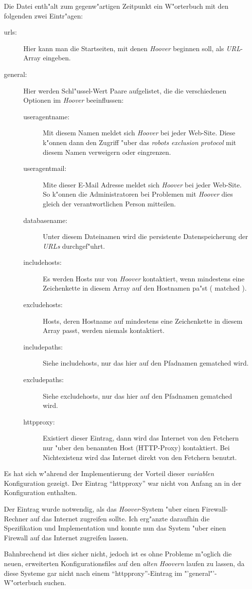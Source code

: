 Die Datei enth"alt zum gegenw"artigen Zeitpunkt ein W"orterbuch mit den folgenden zwei Eintr"agen:
\begin{description}
	\item[urls:]	Hier kann man die Startseiten, mit denen {\em Hoover} beginnen soll, als {\em URL}-Array eingeben.
	\item[general:]	Hier werden Schl"ussel-Wert Paare aufgelistet, die die verschiedenen Optionen im {\em Hoover} beeinflussen:
	\begin{description}
		\item[useragentname:]	Mit diesem Namen meldet sich {\em Hoover} bei jeder Web-Site. Diese k"onnen dann den Zugriff "uber das {\em robots exclusion protocol} mit diesem Namen verweigern oder eingrenzen.
		\item[useragentmail:]	Mite dieser E-Mail Adresse meldet sich {\em Hoover} bei jeder Web-Site. So k"onnen die Administratoren bei Problemen mit {\em Hoover} dies gleich der verantwortlichen Person mitteilen.
		\item[databasename:]	Unter diesem Dateinamen wird die persistente Datenspeicherung der {\em URLs} durchgef"uhrt.
		\item[includehosts:]	Es werden Hosts nur von {\em Hoover} kontaktiert, wenn mindestens eine Zeichenkette in diesem Array auf den Hostnamen pa"st ( matched ).
		\item[excludehosts:]	Hosts, deren Hostname auf mindestens eine Zeichenkette in diesem Array passt, werden niemals kontaktiert.
		\item[includepaths:]	Siehe includehosts, nur das hier auf den Pfadnamen gematched wird.
		\item[excludepaths:]	Siehe excludehosts, nur das hier auf den Pfadnamen gematched wird.
		\item[httpproxy:]		Existiert dieser Eintrag, dann wird das Internet von den Fetchern nur "uber den benannten Host (HTTP-Proxy) kontaktiert. Bei Nichtexistenz wird das Internet direkt von den Fetchern benutzt.
	\end{description}
\end{description}

Es hat sich w"ahrend der Implementierung der Vorteil dieser {\em variablen} Konfiguration gezeigt. Der Eintrag "`httpproxy"' war nicht von Anfang an in der Konfiguration enthalten.

Der Eintrag wurde notwendig, als das {\em Hoover}-System "uber einen Firewall-Rechner auf das Internet zugreifen sollte. Ich erg"anzte daraufhin die Spezifikation und Implementation und konnte nun das System "uber einen Firewall auf das Internet zugreifen lassen.

Bahnbrechend ist dies sicher nicht, jedoch ist es ohne Probleme m"oglich die neuen, erweiterten Konfigurationsfiles auf den {\em alten} {\em Hoovern} laufen zu lassen, da diese Systeme gar nicht nach einem "`httpproxy"'-Eintrag im "'general"'-W"orterbuch suchen.


